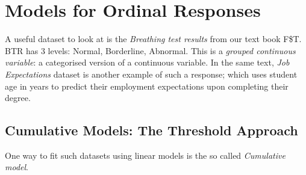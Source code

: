 
\section{Models for Ordinal Responses}

A useful dataset to look at is the \textit{Breathing test results} from our text book F\$T. BTR has 3 levels: Normal, Borderline, Abnormal. This is a \textit{grouped continuous variable}: a categorised version of a continuous variable. In the same text, \textit{Job Expectations} dataset is another example of such a response; which uses student age in years to predict their employment expectations upon completing their degree. 


\subsection{Cumulative Models: The Threshold Approach}
One way to fit such datasets using linear models is the so called \textit{Cumulative model}. 

